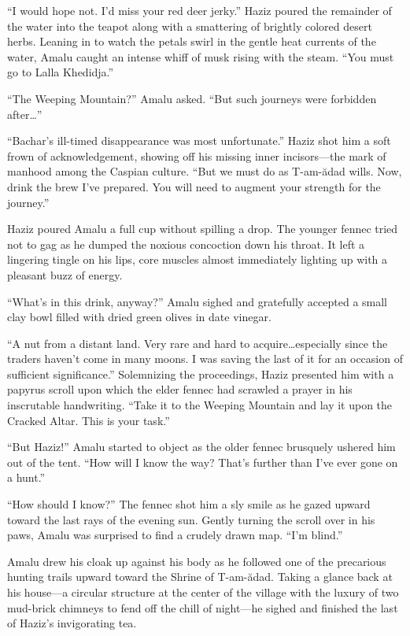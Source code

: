 ``I would hope not. I'd miss your red deer jerky.'' Haziz poured the remainder of the water into the teapot along with a smattering of brightly colored desert herbs. Leaning in to watch the petals swirl in the gentle heat currents of the water, Amalu caught an intense whiff of musk rising with the steam. ``You must go to Lalla Khedidja.''

``The Weeping Mountain?'' Amalu asked. ``But such journeys were forbidden after\ldots''

``Bachar's ill-timed disappearance was most unfortunate.'' Haziz shot him a soft frown of acknowledgement, showing off his missing inner incisors---the mark of manhood among the Caspian culture. ``But we must do as T-am-ădad wills. Now, drink the brew I've prepared. You will need to augment your strength for the journey.''

Haziz poured Amalu a full cup without spilling a drop. The younger fennec tried not to gag as he dumped the noxious concoction down his throat. It left a lingering tingle on his lips, core muscles almost immediately lighting up with a pleasant buzz of energy.

``What's in this drink, anyway?'' Amalu sighed and gratefully accepted a small clay bowl filled with dried green olives in date vinegar.

``A nut from a distant land. Very rare and hard to acquire\ldots{}especially since the traders haven't come in many moons. I was saving the last of it for an occasion of sufficient significance.'' Solemnizing the proceedings, Haziz presented him with a papyrus scroll upon which the elder fennec had scrawled a prayer in his inscrutable handwriting. ``Take it to the Weeping Mountain and lay it upon the Cracked Altar. This is your task.''

``But Haziz!'' Amalu started to object as the older fennec brusquely ushered him out of the tent. ``How will I know the way? That's further than I've ever gone on a hunt.''

``How should I know?'' The fennec shot him a sly smile as he gazed upward toward the last rays of the evening sun. Gently turning the scroll over in his paws, Amalu was surprised to find a crudely drawn map. ``I'm blind.''

\secdiv

\noindent Amalu drew his cloak up against his body as he followed one of the precarious hunting trails upward toward the Shrine of T-am-ădad. Taking a glance back at his house---a circular structure at the center of the village with the luxury of two mud-brick chimneys to fend off the chill of night---he sighed and finished the last of Haziz's invigorating tea.

